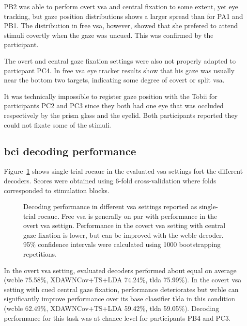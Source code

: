 PB2 was able to perform overt \ac{vsa} and central fixation to some extent,
yet eye tracking, but gaze position distributions shows a larger spread than
for PA1 and PB1.
The distribution in free \ac{vsa}, however, showed that she prefered to attend
stimuli covertly when the gaze was uncued.
This was confirmed by the participant.

The overt and central gaze fixation settings were also not properly adapted to
particpant PC4.
In free \ac{vsa} eye tracker results show that his gaze was usually near the
bottom two targets, indicating some degree of covert or split \ac{vsa}.

It was technically impossible to register gaze position with the Tobii
 for participants PC2 and PC3 since they both had one eye that was
occluded respectively by the prism glass and the eyelid.
Both participants reported they could not fixate some of the
stimuli.

\subsection{\Ac{bci} decoding performance}

Figure~\ref{fig:patients/decode} shows single-trial
\ac{rocauc} in the evaluated \ac{vsa} settings fort the different decoders.
Scores were obtained using 6-fold cross-validation where folds corresponded to
stimulation blocks.

\begin{figure}[t]
  
  \caption[%
    Decoding performance in different \ac{vsa} settings.
  ]{%
    Decoding performance in different \ac{vsa} settings reported as
    single-trial \ac{rocauc}.
    Free \ac{vsa} is generally on par with performance in the overt \ac{vsa}
    settign.
    Performance in the covert \ac{vsa} setting with central gaze fixation is lower, but can
    be improved with the \ac{wcble} decoder.
    95\% confidence intervals were calculated using 1000 bootstrapping
    repetitions.
  }
  \label{fig:patients/decode}
\end{figure}

In the overt \ac{vsa} setting, evaluated decoders performed about equal on average
(\ac{wcble} 75.58\%, XDAWNCov+TS+LDA 74.24\%, \ac{tlda} 75.99\%).
In the covert \ac{vsa} setting with cued central gaze fixation, performance deteriorates
but \ac{wcble} can significantly improve performance over its base classifier
\ac{tlda} in this condition
(\ac{wcble} 62.49\%, XDAWNCov+TS+LDA 59.42\%, \ac{tlda} 59.05\%).
Decoding performance for this task was at chance level for participants PB4 and
PC3.

